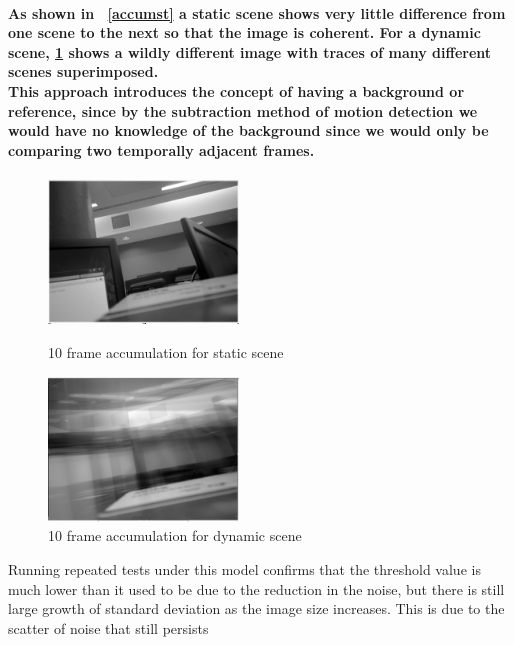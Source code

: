 \paragraph{As shown in ~\cref{accumst} a static scene shows very little difference from one scene to the next so that the image is coherent. For a dynamic scene, \cref{accumdy} shows a wildly different image with traces of many different scenes superimposed.
\\This approach introduces the concept of having a background or reference, since by the subtraction method of motion detection we would have no knowledge of the background since we would only be comparing two temporally adjacent frames.
}
\begin{figure}
	\vspace{-30pt}
	\begin{center}
		\includegraphics[width=0.45\textwidth]{../images/accumstatic}
	\end{center}
	\vspace{-20pt}
	\caption{10 frame accumulation for static scene}
	\label{accumst}
	\vspace{10pt}
	\begin{center}
		\includegraphics[width=0.45\textwidth]{../images/accumdynamic}
	\end{center}
	\vspace{-20pt}
	\caption{10 frame accumulation for dynamic scene}
	\label{accumdy}
	\vspace{30pt}
\end{figure}
Running repeated tests under this model confirms that the threshold value is much lower than it used to be due to the reduction in the noise, but there is still large growth of standard deviation as the image size increases. This is due to the scatter of noise that still persists 
